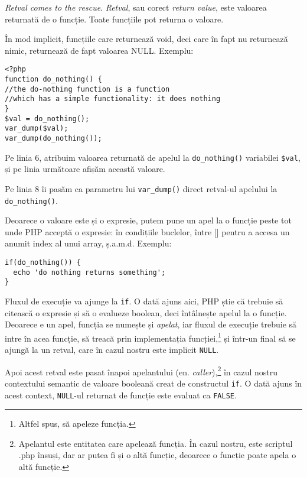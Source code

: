 \textit{Retval comes to the rescue}. \textsl{Retval}, sau corect \textsl{return value},
este valoarea returnată de o funcție. Toate funcțiile pot returna o valoare.

În mod implicit, funcțiile care returnează void, deci care în fapt nu returnează
nimic, returnează de fapt valoarea NULL. Exemplu:
\begin{lstlisting}
<?php
function do_nothing() {
//the do-nothing function is a function
//which has a simple functionality: it does nothing
}
$val = do_nothing();
var_dump($val);
var_dump(do_nothing());
\end{lstlisting}

Pe linia 6, atribuim valoarea returnată de apelul la \texttt{do\_nothing()}
variabilei \texttt{\$val}, și pe linia următoare afișăm această valoare.

Pe linia 8 îi pasăm ca parametru lui \texttt{var\_dump()} direct retval-ul apelului
la \texttt{do\_nothing()}.


Deoarece o valoare este și o expresie, putem pune un apel la o funcție peste tot
unde PHP acceptă o expresie: în condițiile buclelor, între [] pentru a accesa un
anumit index al unui array, ș.a.m.d. Exemplu:

\begin{lstlisting}
if(do_nothing()) {
  echo 'do nothing returns something';
}
\end{lstlisting}
Fluxul de execuție va ajunge la \texttt{if}. O dată ajuns aici, PHP știe că
trebuie să citească o expresie și să o evalueze boolean, deci întâlnește apelul
la o funcție. Deoarece e un apel, funcția se numește și \textsl{apelat},
iar fluxul de execuție trebuie să intre în
acea funcție, să treacă prin implementația funcției,\footnote{Altfel spus, să
apeleze funcția.} și într-un final
să se ajungă la un retval, care în cazul nostru este implicit \texttt{NULL}.

Apoi acest retval este pasat înapoi
apelantului (en. \textsl{caller}),\footnote{Apelantul este entitatea care apelează funcția. În cazul nostru,
este scriptul .php însuși, dar ar putea fi și o altă funcție, deoarece
o funcție poate apela o altă funcție.}
în cazul nostru contextului
semantic de valoare booleană creat de constructul \texttt{if}. O dată ajuns
în acest context, \texttt{NULL}-ul returnat de funcție este evaluat ca \texttt{FALSE}.

